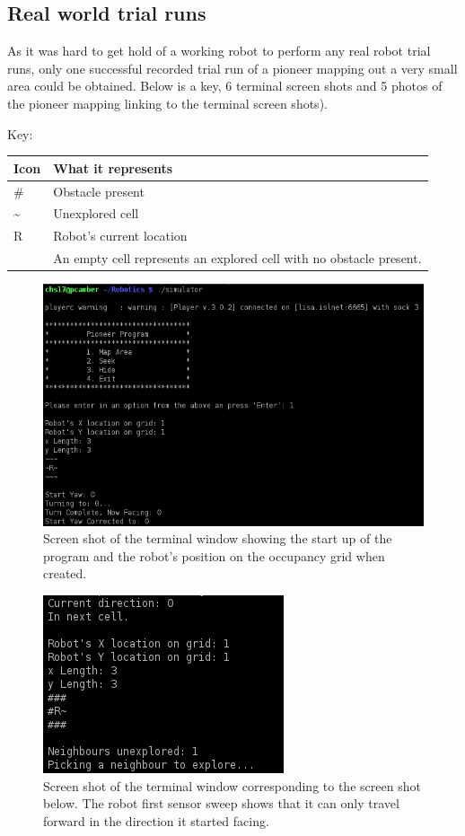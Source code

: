 \documentclass[a4paper,12pt]{article}
\begin{document}
\subsection{Real world trial runs}
\noindent As it was hard to get hold of a working robot to perform any real robot trial runs, only one successful recorded trial run of a pioneer mapping out a very small area could be obtained. Below is a key, 6 terminal screen shots and 5 photos of the pioneer mapping linking to the terminal screen shots).

\vspace{5mm}
\noindent Key:
\begin{table}[H]
\begin{tabular}{| l | l |}
	\hline
	\textbf{Icon} & \textbf{What it represents}
	\\\hline
	\# & Obstacle present
	\\\hline
	\textasciitilde & Unexplored cell
	\\\hline
	R & Robot's current location
	\\\hline
	 & An empty cell represents an explored cell with no obstacle present.
	\\\hline
\end{tabular}
\end{table}

\begin{figure}[H]
\includegraphics[scale=0.9]{RealRunStart.png}
\caption{Screen shot of the terminal window showing the start up of the program and the robot's position on the occupancy grid when created.}
\end{figure}

\begin{figure}[H]
\includegraphics[scale=1.0]{RealRunT1.png}
\caption{Screen shot of the terminal window corresponding to the screen shot below. The robot first sensor sweep shows that it can only travel forward in the direction it started facing.}
\end{figure}
\end{document}
